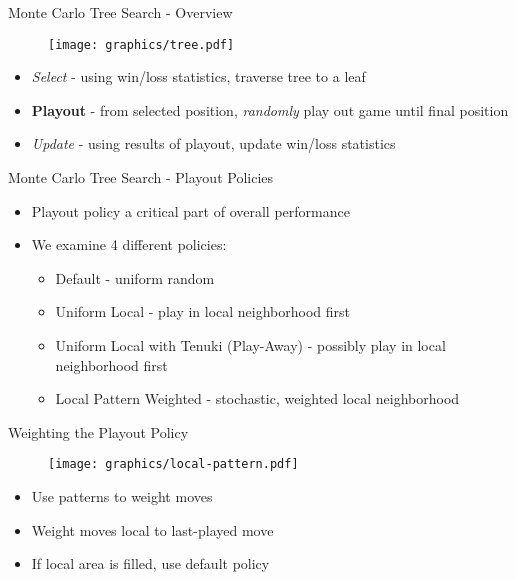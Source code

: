 \documentclass{beamer}
\begin{document}
\begin{frame}{Monte Carlo Tree Search - Overview}
\begin{figure}
  \begin{center}
  \texttt{[image: graphics/tree.pdf]}
  \label{fig:encoding}
  \end{center}
\end{figure}
\begin{itemize}
	\item \emph{Select} - using win/loss statistics, traverse tree to a leaf
	\item {\bf Playout} - from selected position, \emph{randomly} play out game until final position
	\item \emph{Update} - using results of playout, update win/loss statistics
\end{itemize}
\end{frame}

\begin{frame}{Monte Carlo Tree Search - Playout Policies}
\begin{itemize}
	\item Playout policy a critical part of overall performance
	\item We examine 4 different policies:
	\begin{itemize}
		\item Default - uniform random
		\item Uniform Local - play in local neighborhood first
		\item Uniform Local with Tenuki (Play-Away) - possibly play in local neighborhood first
		\item Local Pattern Weighted - stochastic, weighted local neighborhood
	\end{itemize}
\end{itemize}
\end{frame}

\begin{frame}{Weighting the Playout Policy}
\begin{figure}
  \begin{center}
  \texttt{[image: graphics/local-pattern.pdf]}
  \label{fig:encoding}
  \end{center}
\end{figure}
\begin{itemize}
	\item Use patterns to weight moves
	\item Weight moves local to last-played move
	\item If local area is filled, use default policy
\end{itemize}
\end{frame}
\end{document}
